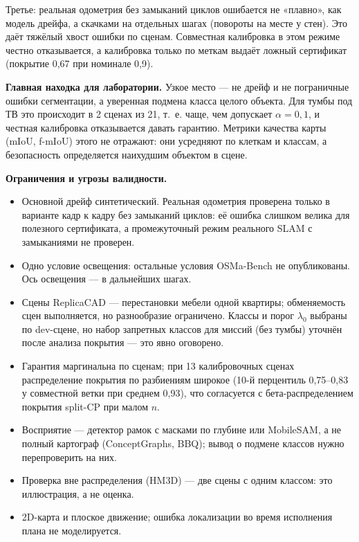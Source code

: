 Третье: реальная одометрия без замыканий циклов ошибается не «плавно», как модель дрейфа, а скачками на отдельных шагах (повороты на месте у стен). Это даёт тяжёлый хвост ошибки по сценам. Совместная калибровка в этом режиме честно отказывается, а калибровка только по меткам выдаёт ложный сертификат (покрытие 0{,}67 при номинале 0{,}9).

\textbf{Главная находка для лаборатории.} Узкое место --- не дрейф и не пограничные ошибки сегментации, а уверенная подмена класса целого объекта. Для тумбы под ТВ это происходит в 2 сценах из 21, т.~е. чаще, чем допускает $\alpha = 0{,}1$, и честная калибровка отказывается давать гарантию. Метрики качества карты (mIoU, f-mIoU) этого не отражают: они усредняют по клеткам и классам, а безопасность определяется наихудшим объектом в сцене.

\textbf{Ограничения и угрозы валидности.}
\begin{itemize}[nosep]
  \item Основной дрейф синтетический. Реальная одометрия проверена только в варианте кадр к кадру без замыканий циклов: её ошибка слишком велика для полезного сертификата, а промежуточный режим реального SLAM с замыканиями не проверен.
  \item Одно условие освещения: остальные условия OSMa-Bench не опубликованы. Ось освещения --- в дальнейших шагах.
  \item Сцены ReplicaCAD --- перестановки мебели одной квартиры; обменяемость сцен выполняется, но разнообразие ограничено. Классы и порог $\lambda_0$ выбраны по dev-сцене, но набор запретных классов для миссий (без тумбы) уточнён после анализа покрытия --- это явно оговорено.
  \item Гарантия маргинальна по сценам; при 13 калибровочных сценах распределение покрытия по разбиениям широкое (10-й перцентиль 0{,}75--0{,}83 у совместной ветки при среднем 0{,}93), что согласуется с бета-распределением покрытия split-CP при малом $n$.
  \item Восприятие --- детектор рамок с масками по глубине или MobileSAM, а не полный картограф (ConceptGraphs, BBQ); вывод о подмене классов нужно перепроверить на них.
  \item Проверка вне распределения (HM3D) --- две сцены с одним классом: это иллюстрация, а не оценка.
  \item 2D-карта и плоское движение; ошибка локализации во время исполнения плана не моделируется.
\end{itemize}
